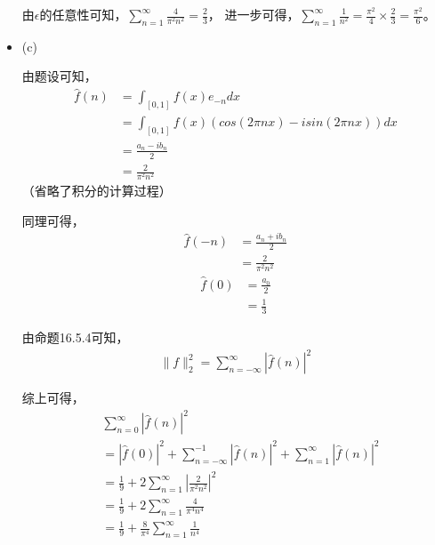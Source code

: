 \documentclass{article}
\begin{document}
\begin{itemize}
        由$\epsilon$的任意性可知，$\sum \limits_{n = 1}^\infty \frac{4}{\pi^2 n^2} = \frac{2}{3}$，
        进一步可得，$\sum \limits_{n = 1}^\infty \frac{1}{n^2} = \frac{\pi^2}{4} \times \frac{2}{3} = \frac{\pi^2}{6}$。

  \item (c)

        由题设可知，
        \begin{align*}
          \hat{f}(n) & = \int_{[0, 1]} f(x) e_{-n} dx                         \\
                     & = \int_{[0, 1]} f(x) (cos(2\pi nx) - isin(2\pi nx)) dx \\
                     & = \frac{a_n -ib_n}{2}                                  \\
                     & = \frac{2}{\pi^2 n^2}
        \end{align*}
        （省略了积分的计算过程）

        同理可得，
        \begin{align*}
          \hat{f}(-n) & = \frac{a_n + ib_n}{2} \\
                      & = \frac{2}{\pi^2 n^2}
        \end{align*}
        \begin{align*}
          \hat{f}(0) & = \frac{a_0}{2} \\
                     & = \frac{1}{3}
        \end{align*}

        由命题16.5.4可知，
        \begin{align*}
          \|f\|_2^2 = \sum \limits_{n = -\infty}^\infty |\hat{f}(n)|^2
        \end{align*}

        综上可得，
        \begin{align*}
           & \sum \limits_{n = 0}^\infty |\hat{f}(n)|^2                                                                     \\
           & = |\hat{f}(0)|^2 + \sum \limits_{n = -\infty}^{-1} |\hat{f}(n)|^2 + \sum \limits_{n = 1}^\infty |\hat{f}(n)|^2 \\
           & = \frac{1}{9} + 2\sum \limits_{n = 1}^\infty |\frac{2}{\pi^2 n^2}|^2                                           \\
           & = \frac{1}{9} + 2\sum \limits_{n = 1}^\infty \frac{4}{\pi^4 n^4}                                               \\
           & = \frac{1}{9} + \frac{8}{\pi^4} \sum \limits_{n = 1}^\infty \frac{1}{n^4}
        \end{align*}


\end{itemize}
\end{document}
